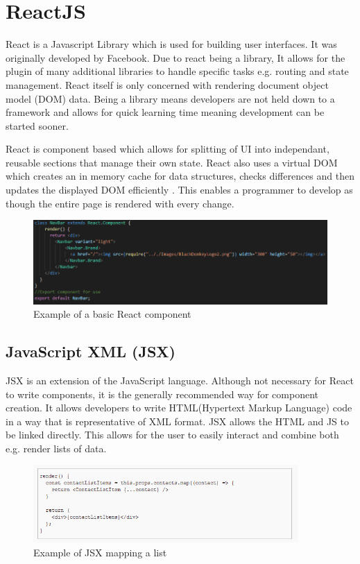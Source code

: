 \section{ReactJS}
React is a Javascript Library which is used for building user interfaces. It was originally developed by Facebook. Due to react being a library, It allows for the plugin of many additional libraries to handle specific tasks e.g. routing and state management. React itself is only concerned with rendering document object model (DOM) data. Being a library means developers are not held down to a framework and allows for quick learning time meaning development can be started sooner. \par
React is component based which allows for splitting of UI into independant, reusable sections that manage their own state. React also uses a virtual DOM which creates an in memory cache for data structures, checks differences and then updates the displayed DOM efficiently \cite{10.1145/2980991}. This enables a programmer to develop as though the entire page is rendered with every change.
\begin{figure}[h!]
 	\caption{Example of a basic React component}
	\label{image:reactcomponent}
 	\centering
 	\includegraphics[width=1.0\textwidth]{Images/reactcomponent.PNG}
\end{figure}

\subsection{JavaScript XML (JSX)}
JSX is an extension of the JavaScript language. Although not necessary for React to write components, it is the generally recommended way for component creation. It allows developers to write HTML(Hypertext Markup Language) code in a way that is representative of XML format. JSX allows the HTML and JS to be linked directly. This allows for the user to easily interact and combine both e.g. render lists of data.

\begin{figure}[h!]
 	\caption{Example of JSX mapping a list}
	\label{image:jsx}
 	\centering
 	\includegraphics[width=0.9\textwidth]{Images/JSX Example.PNG}
\end{figure}

